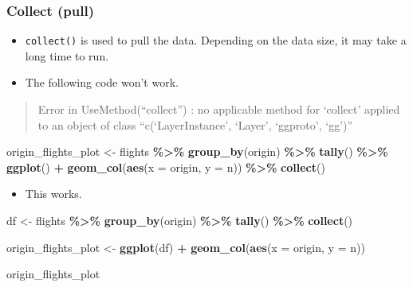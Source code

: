 \documentclass[
]{book}
\newenvironment{Shaded}{\begin{snugshade}}{\end{snugshade}}
\newcommand{\DataTypeTok}[1]{\textcolor[rgb]{0.13,0.29,0.53}{#1}}
\newcommand{\KeywordTok}[1]{\textcolor[rgb]{0.13,0.29,0.53}{\textbf{#1}}}
\newcommand{\NormalTok}[1]{#1}
\newcommand{\OperatorTok}[1]{\textcolor[rgb]{0.81,0.36,0.00}{\textbf{#1}}}
\newcommand{\StringTok}[1]{\textcolor[rgb]{0.31,0.60,0.02}{#1}}
\providecommand{\tightlist}{%
  \setlength{\itemsep}{0pt}\setlength{\parskip}{0pt}}
\begin{document}
\hypertarget{collect-pull}{%
\subsubsection{Collect (pull)}\label{collect-pull}}

\begin{itemize}
\item
  \texttt{collect()} is used to pull the data. Depending on the data size, it may take a long time to run.
\item
  The following code won't work.
\end{itemize}

\begin{quote}
Error in UseMethod(``collect'') : no applicable method for `collect' applied to an object of class ``c(`LayerInstance', `Layer', `ggproto', `gg')''
\end{quote}

\begin{Shaded}
\begin{Highlighting}[]
\NormalTok{origin\_flights\_plot \textless{}{-}}\StringTok{ }\NormalTok{flights }\OperatorTok{\%\textgreater{}\%}
\StringTok{  }\KeywordTok{group\_by}\NormalTok{(origin) }\OperatorTok{\%\textgreater{}\%}
\StringTok{  }\KeywordTok{tally}\NormalTok{() }\OperatorTok{\%\textgreater{}\%}
\StringTok{  }\KeywordTok{ggplot}\NormalTok{() }\OperatorTok{+}
\StringTok{  }\KeywordTok{geom\_col}\NormalTok{(}\KeywordTok{aes}\NormalTok{(}\DataTypeTok{x =}\NormalTok{ origin, }\DataTypeTok{y =}\NormalTok{ n)) }\OperatorTok{\%\textgreater{}\%}
\StringTok{  }\KeywordTok{collect}\NormalTok{()}
\end{Highlighting}
\end{Shaded}

\begin{itemize}
\tightlist
\item
  This works.
\end{itemize}

\begin{Shaded}
\begin{Highlighting}[]
\NormalTok{df \textless{}{-}}\StringTok{ }\NormalTok{flights }\OperatorTok{\%\textgreater{}\%}
\StringTok{  }\KeywordTok{group\_by}\NormalTok{(origin) }\OperatorTok{\%\textgreater{}\%}
\StringTok{  }\KeywordTok{tally}\NormalTok{() }\OperatorTok{\%\textgreater{}\%}
\StringTok{  }\KeywordTok{collect}\NormalTok{()}

\NormalTok{origin\_flights\_plot \textless{}{-}}\StringTok{ }\KeywordTok{ggplot}\NormalTok{(df) }\OperatorTok{+}
\StringTok{  }\KeywordTok{geom\_col}\NormalTok{(}\KeywordTok{aes}\NormalTok{(}\DataTypeTok{x =}\NormalTok{ origin, }\DataTypeTok{y =}\NormalTok{ n))}

\NormalTok{origin\_flights\_plot}
\end{Highlighting}
\end{Shaded}
\end{document}
